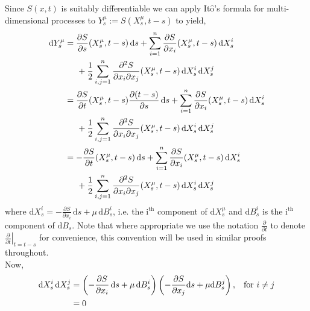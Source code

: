 \documentclass[a4paper,12pt,draft]{report}
\begin{document}
{
Since $S(x, t)$ is suitably differentiable we can apply It$\mathrm{\hat{o}}$'s formula for multi-dimensional processes to $Y^{\mu}_{s} := S(X^{\mu}_{s}, t - s)$ to yield,
\begin{align}
\mathrm{d}Y^{\mu}_{s} & = \frac{\partial S}{\partial s}(X^{\mu}_{s}, t - s)\,\mathrm{d}s + \sum_{i = 1}^n \frac{\partial S}{\partial x_{i}}(X^{\mu}_{s}, t - s)\,\mathrm{d}X^{i}_{s}\nonumber\\
& \hspace{0.5cm} + \frac{1}{2}\sum_{i, j = 1}^{n} \frac{\partial^2 S}{\partial x_{i} \partial x_{j}}(X^{\mu}_{s}, t - s)\,\mathrm{d}X^{i}_{s}\,\mathrm{d}X_s^j\nonumber\\
& = \frac{\partial S}{\partial t}(X^{\mu}_{s}, t - s)\frac{\partial(t - s)}{\partial s}\,\mathrm{d}s + \sum_{i = 1}^n \frac{\partial S}{\partial x_{i}}(X^{\mu}_{s}, t - s)\,\mathrm{d}X^{i}_{s}\nonumber\\
& \hspace{0.5cm} + \frac{1}{2}\sum_{i, j = 1}^{n} \frac{\partial^2 S}{\partial x_{i} \partial x_{j}}(X^{\mu}_{s}, t - s)\,\mathrm{d}X^{i}_{s}\,\mathrm{d}X_s^j\nonumber\\
& = -\frac{\partial S}{\partial t}(X^{\mu}_{s}, t - s)\,\mathrm{d}s + \sum_{i = 1}^n \frac{\partial S}{\partial x_{i}}(X^{\mu}_{s}, t - s)\,\mathrm{d}X^{i}_{s}\nonumber\\
& \hspace{0.5cm} + \frac{1}{2}\sum_{i, j = 1}^{n} \frac{\partial^2 S}{\partial x_{i} \partial x_{j}}(X^{\mu}_{s}, t - s)\,\mathrm{d}X^{i}_{s}\,\mathrm{d}X_s^j\nonumber
\end{align}
where $\mathrm{d}X^{i}_{s} = -\frac{\partial S}{\partial x_{i}}\,\mathrm{d}s + \mu\,\mathrm{d}B_s^i$, i.e. the $\mathrm{i^{th}}$ component of $\mathrm{d}X^{\mu}_{s}$ and $\mathrm{d}B_s^i$ is the $\mathrm{i^{th}}$ component of $\mathrm{d}B_{s}$.  Note that where appropriate we use the notation $\frac{\partial}{\partial t}$ to denote $\left.\frac{\partial}{\partial t}\right|_{t = t - s}$ for convenience, this convention will be used in similar proofs throughout.
\\Now, 
\begin{align}
\mathrm{d}X^{i}_{s}\,\mathrm{d}X_s^j & = \left(-\frac{\partial S}{\partial x_{i}}\,\mathrm{d}s + \mu\,\mathrm{d}B_s^i\right)\left(-\frac{\partial S}{\partial x_{j}}\mathrm{d}s + \mu\mathrm{d}B_s^j\right), \hspace{0.3cm} \text{for } i \ne j \nonumber \\
& = 0 \nonumber
\end{align}
}
\end{document}
